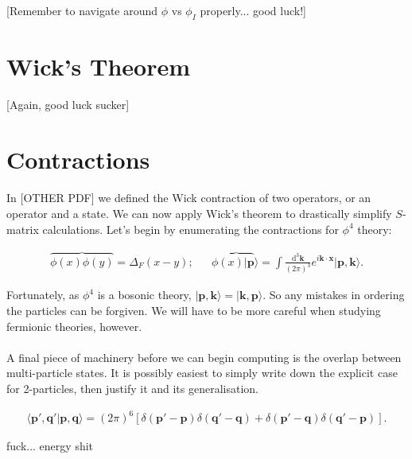 \documentclass[12pt]{report}
\begin{document}
[Remember to navigate around $\phi$ vs $\phi_I$ properly... good luck!]

\section{Wick's Theorem}

[Again, good luck sucker]

\section{Contractions}

\paragraph{} In [OTHER PDF] we defined the Wick contraction of two operators, or an operator and a state. We can now apply Wick's theorem to drastically simplify $S$-matrix calculations. Let's begin by enumerating the contractions for $\phi^4$ theory:

	\begin{align}
	\overbrace{\phi(x)\phi(y)} = \Delta_F(x-y); &&
	 \phi\overbrace{(x) |\mathbf{p}}\rangle	 = \int \frac{\mathrm{d}^3\mathbf{k}}{(2 \pi)^3} e^{i \mathbf{k}\cdot \mathbf{x}} |\mathbf{p},\mathbf{k}\rangle.
	\end{align}

Fortunately, as $\phi^4$ is a bosonic theory, $|\mathbf{p},\mathbf{k}\rangle = |\mathbf{k},\mathbf{p}\rangle$. So any mistakes in ordering the particles can be forgiven. We will have to be more careful when studying fermionic theories, however.

\paragraph{} A final piece of machinery before we can begin computing is the overlap between multi-particle states. It is possibly easiest to simply write down the explicit case for 2-particles, then justify it and its generalisation.

	\begin{align}
		\langle \mathbf{p}' , \mathbf{q}' | \mathbf{p} , \mathbf{q} \rangle = (2\pi)^6 \left[ \delta( \mathbf{p}' -  \mathbf{p})\delta( \mathbf{q}' -  \mathbf{q}) + \delta( \mathbf{p}' -  \mathbf{q})\delta(  \mathbf{q}' -  \mathbf{p} ) \right].
	\end{align}

fuck... energy shit
\end{document}
